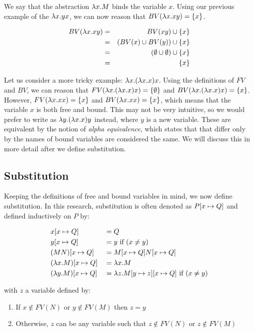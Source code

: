 We say that the abstraction $\lambda {x}.{M}$ binds the variable $x$. Using our previous example of the \lterm $\lambda {x}.{yx}$, we can now reason that $BV(\lambda {x}.{xy}) = \{x\}$. 

\begin{eqnarray*}
	BV(\lambda {x}.{xy}) &=& BV(xy) \cup \{x\} \\
	&=& (BV(x) \cup BV(y)) \cup \{x\} \\
	&=& (\emptyset \cup \emptyset) \cup \{x\} \\
	&=& \{x\}
\end{eqnarray*}

Let us consider a more tricky example: $\lambda {x}.{(\lambda {x}.{x})x}$. Using the definitions of $FV$ and $BV$, we can reason that $FV(\lambda {x}.{(\lambda {x}.{x})x}) = \{\emptyset\}$ and $BV(\lambda {x}.{(\lambda {x}.{x})x}) = \{x\}$. 
However, $FV(\lambda {x}.{x}x) = \{x\}$ and $BV(\lambda {x}.{x}x) = \{x\}$, which means that the variable $x$ is both free and bound.
This may not be very intuitive, so we would prefer to write \lterm as $\lambda {y}.{(\lambda {x}.{x})y}$ instead, where $y$ is a new variable.
These \lterms are equivalent by the notion of \emph{alpha equivalence}, which states that \lterms that differ only by the names of bound variables are considered the same.
We will discuss this in more detail after we define substitution.

\subsection{Substitution}
Keeping the definitions of free and bound variables in mind, we now define substitution. 
In this research, substitution is often denoted as $P [{x}\mapsto{Q}]$ and defined inductively on $P$ by:

\[
\begin{aligned}
	& x [{x}\mapsto{Q}]             & &= Q \\
	& y [{x}\mapsto{Q}]             & &= y \text{ if } (x \neq y)\\
	& (M N) [{x}\mapsto{Q}]         & &= M [{x}\mapsto{Q}] N [{x}\mapsto{Q}] \\
	& (\lambda {x}.{M}) [{x}\mapsto{Q}] & &= \lambda {x}.{M} \\
	& (\lambda {y}.{M}) [{x}\mapsto{Q}] & &= \lambda {z}.{M [{y}\mapsto{z}][{x}\mapsto{Q}]} \text{ if } (x \neq y) \\
\end{aligned}
\]

with $z$ a variable defined by:
\begin{enumerate}
	\item%
	If $x \notin FV(N)$ or $y \notin FV(M)$ then $z = y$
	\item%
	Otherwise, $z$ can be any variable such that $z \notin FV(N)$ or $z \notin FV(M)$
\end{enumerate}

